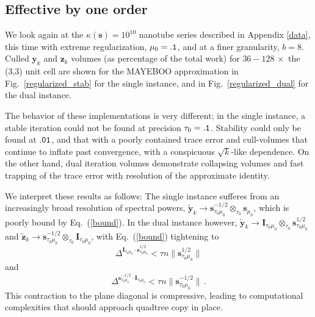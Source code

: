 \documentclass[letterpaper,twocolumn,amsmath,amsfont,amssymb,english,aps,jcp,preprintnumbers,groupaddress,nofootinbib,tightenlines,floatfix]{revtex4}
\newcommand{\mat}[1]{\boldsymbol{#1}}
\newcommand{\oto}{ {\scriptstyle \otimes}_{ \! \tau_0 } }
\theoremstyle{plain}
\theoremstyle{remark}
\theoremstyle{plain}
\begin{document}
\subsection{Effective by one order}

We look again at the $\kappa(\mat{s})=10^{10}$ nanotube series described in Appendix \ref{data},
this time with extreme regularization, $\mu_0={\tt .1}$, and at a finer granularity, $b=8$.
Culled $\mat{y}_k$ and $\mat{z}_k$ volumes (as percentage of the total work) for $36 - 128 \, \times$ the (3,3) unit cell
are shown for the MAYEBOO approximation in Fig.~\ref{regularized_stab} for the single instance, 
and in Fig.~\ref{regularized_dual} for the dual instance. 

The behavior of these implementations  is very different; in the single 
instance, a stable  iteration could not be found at precision $\tau_0=\tt .1$.  Stability could 
only be found at ${\tt .01}$, and that with a poorly contained trace error and cull-volumes 
that continue to inflate past convergence, with a conspicuous $\sqrt{k}$-like dependence.  
On the other hand, dual iteration volumes demonstrate
collapsing volumes and fast trapping of the trace error with resolution of the approximate identity.

We interpret these results as follows: The single instance sufferes from an increasingly broad resolution of spectral powers,
$\widetilde{\mat{y}}_k \rightarrow  \mat{s}^{-1/2}_{\tau_0 \mu_0} \oto \mat{s}_{\mu_0}$, which is  poorly bound by Eq.~(\ref{bound}). 
In the dual instance however, $\widetilde{\mat{y}}_k\rightarrow  \mat{I}_{\tau_0 \mu_0} \oto \mat{s}^{1/2}_{\tau_0 \mu_0}$
and $\widetilde{\mat{z}}_k \rightarrow  \mat{s}^{-1/2}_{\tau_0 \mu_0} \oto \mat{I}_{\tau_0 \mu_0}$, 
with Eq.~(\ref{bound}) tightening to
\begin{equation}\label{boundY}
\Delta^{\mat{I}_{\tau_0 \mu_0} \cdot \mat{s}^{1/2}_{\tau_0 \mu_0}} <  \tau n \lVert \mat{s}^{1/2}_{\tau_0 \mu_0} \rVert
\end{equation}
and 
\begin{equation}\label{boundZ}
\Delta^{ \mat{s}^{-1/2}_{\tau_0 \mu_0}\cdot \mat{I}_{\tau_0 \mu_0}}  <  \tau n \lVert \mat{s}^{-1/2}_{\tau_0 \mu_0} \rVert \, .
\end{equation}
This contraction to the plane diagonal is compressive, leading to computational complexities that should approach quadtree copy in place.   
\end{document}
